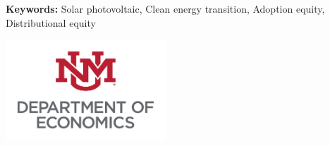 \begin{titlepage}
\begin{center}
\begin{flushleft}
    \vspace{1em}
\textbf{Keywords:} Solar photovoltaic, Clean energy transition, Adoption equity, Distributional equity

\end{flushleft}
   \vspace{1em}

\includegraphics[width = 6cm]{figures/unm.png}






\end{center}

\end{titlepage}

